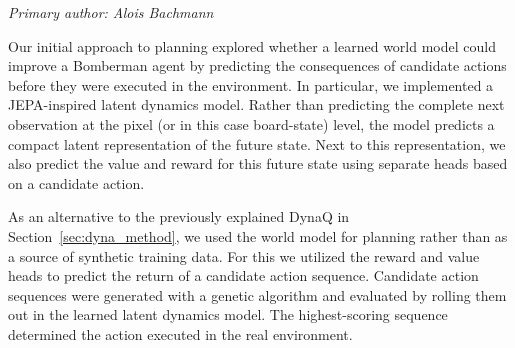 \documentclass[article, 10pt]{IEEEtran}
\begin{document}
\textit{Primary author: Alois Bachmann}


    






Our initial approach to planning explored whether a learned world model could improve a Bomberman agent by predicting the consequences of candidate actions before they were executed in the environment. In particular, we implemented a JEPA-inspired latent dynamics model. Rather than predicting the complete next observation at the pixel (or in this case board-state) level, the model predicts a compact latent representation of the future state. Next to this representation, we also predict the value and reward for this future state using separate heads based on a candidate action. 

As an alternative to the previously explained DynaQ in Section~\ref{sec:dyna_method}, we used the world model for planning rather than as a source of synthetic training data. For this we utilized the reward and value heads to predict the return of a candidate action sequence. Candidate action sequences were generated with a genetic algorithm and evaluated by rolling them out in the learned latent dynamics model. The highest-scoring sequence determined the action executed in the real environment. 
\end{document}
